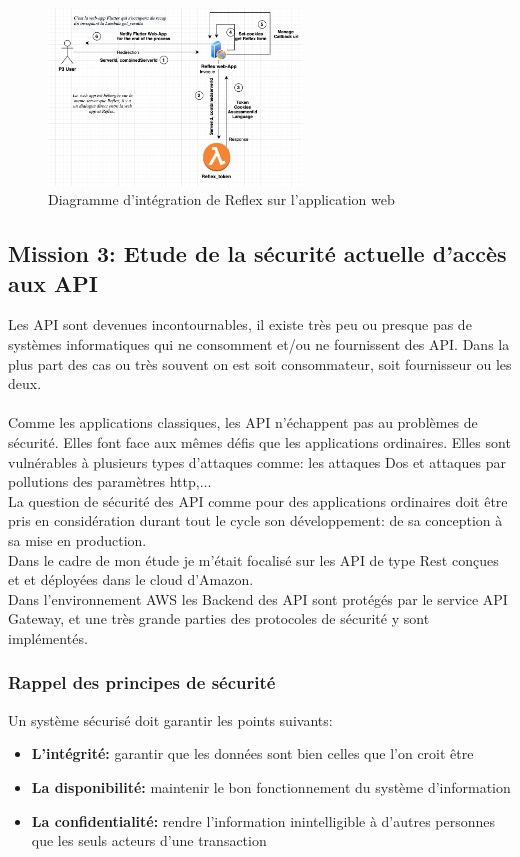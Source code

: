  \begin{figure}[H]
            \centering
                \includegraphics[width=0.6\textwidth]{Figures/reflexapp}
	       \decoRule
		\caption[Diagramme d'intégration de Reflex sur l'application web]{Diagramme d'intégration de Reflex sur l'application web}
	\label{fig:Diagramme d'intégration de Reflex sur l'application web}
\end{figure}
\newpage
\subsection{Mission 3: Etude de la sécurité actuelle d’accès aux API}
Les API sont devenues incontournables, il existe très peu ou presque pas de systèmes informatiques qui ne consomment et/ou ne fournissent des API. Dans la plus part des cas ou très souvent on est soit consommateur, soit fournisseur  ou les deux.\\ \\ Comme les applications classiques, les API n'échappent pas au problèmes de sécurité. Elles font face aux mêmes défis que les applications ordinaires. Elles sont vulnérables à plusieurs types  d'attaques comme: les attaques Dos et attaques par pollutions des paramètres http,...\\ La question de sécurité des API comme pour des applications ordinaires doit être pris en considération durant tout le cycle son développement: de sa conception à sa mise en production. \\Dans le cadre de mon étude je m'était focalisé sur les API de type Rest conçues et et déployées dans le cloud d'Amazon.\\ Dans l'environnement AWS les Backend des API sont protégés par le service API Gateway, et une très grande parties des protocoles de sécurité y sont implémentés.
\subsubsection{Rappel des principes de sécurité}
Un système sécurisé doit garantir les points suivants:
\begin{itemize}
\item \textbf{L'intégrité:} garantir que les données sont bien celles que l'on croit être
\item \textbf{La disponibilité:} maintenir le bon fonctionnement du système d'information
\item \textbf{La confidentialité:} rendre l'information inintelligible à d'autres personnes que les seuls acteurs d'une transaction
\end{itemize}
